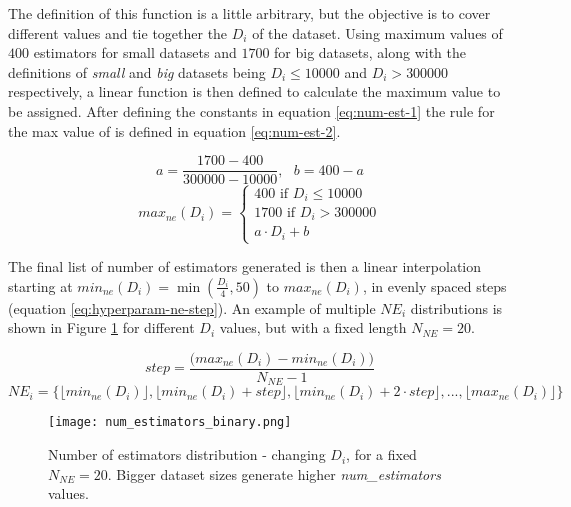 The definition of this function is a little arbitrary, but the objective is to cover different values and tie together the $D_i$ of the dataset. Using maximum values of $400$ estimators for small datasets and $1700$ for big datasets, along with the definitions of \textit{small} and \textit{big} datasets being $D_i\leq10000$ and $D_i>300000$ respectively, a linear function is then defined to calculate the maximum value to be assigned. After defining the constants in equation \ref{eq:num-est-1} the rule for the max value of  is defined in equation \ref{eq:num-est-2}.

\begin{equation}
    a = \frac{1700 - 400}{300000 - 10000}, \text{ }b = 400 - a
    \label{eq:num-est-1}
\end{equation}
\begin{equation}
    max_{ne}(D_i) = \begin{cases}
        400 \text{ if } D_i \leq 10000 \\
        1700 \text{ if } D_i > 300000 \\
        a \cdot D_i + b
    \end{cases}
    \label{eq:num-est-2}
\end{equation}

The final list of number of estimators generated is then a linear interpolation starting at $min_{ne}(D_i) = \min(\frac{D_i}{4}, 50)$ to $max_{ne}(D_i)$, in evenly spaced steps (equation \ref{eq:hyperparam-ne-step}). An example of multiple $NE_i$ distributions is shown in Figure \ref{fig:hyperparam-ne1} for different $D_i$ values, but with a fixed length $N_{NE} = 20$.

$$step = \frac{\Big(max_{ne}(D_i) - min_{ne}(D_i)\Big)}{N_{NE} - 1}$$
\begin{equation}
    NE_i = \Big\{\lfloor min_{ne}(D_i) \rfloor,\lfloor min_{ne}(D_i) + step \rfloor,\lfloor min_{ne}(D_i) + 2\cdot step \rfloor, ... ,\lfloor max_{ne}(D_i)\rfloor\Big\}
    \label{eq:hyperparam-ne-step}
\end{equation}

\begin{figure}[!h]
    \centering
    \texttt{[image: num\_estimators\_binary.png]} 
    \caption{Number of estimators distribution - changing $D_i$, for a fixed $N_{NE} = 20$. Bigger dataset sizes generate higher \textit{num\_estimators} values.}
    \label{fig:hyperparam-ne1}
\end{figure}

\newpage
